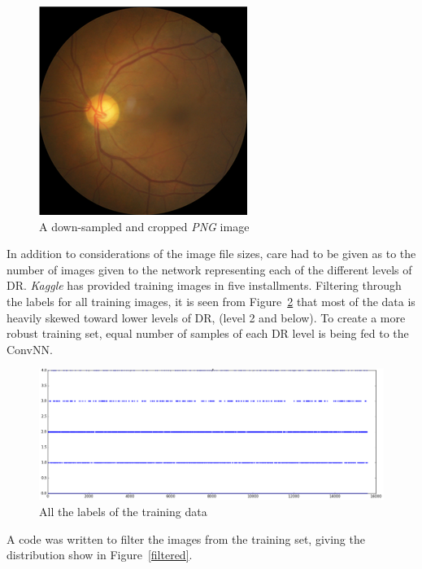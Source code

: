 \documentclass[letterpaper,12pt]{article}
\newcommand{\figref}[1]{Figure~\ref{#1}}
\begin{document}
\begin{figure}[htbp]
\begin{center}
\includegraphics[scale=0.75]{images/png_format.png}
\caption{A down-sampled and cropped \textit{PNG} image} 
\label{png}
\end{center}
\end{figure}

In addition to considerations of the image file sizes, care had to be given as to the number of images given to the network representing each of the different levels of DR. \textit{Kaggle} has provided training images in five installments. Filtering through the labels for all training images, it is seen from \figref{fullSample} that most of the data is heavily skewed toward lower levels of DR, (level 2 and below). To create a more robust training set, equal number of samples of each DR level is being fed to the ConvNN. 

\begin{figure}[htbp]
\begin{center}
\includegraphics[scale=0.25]{images/FullSample.png}
\caption{All the labels of the training data}
\label{fullSample}
\end{center}
\end{figure}

A code was written to filter the images from the training set, giving the distribution show in \figref{filtered}.
\end{document}

